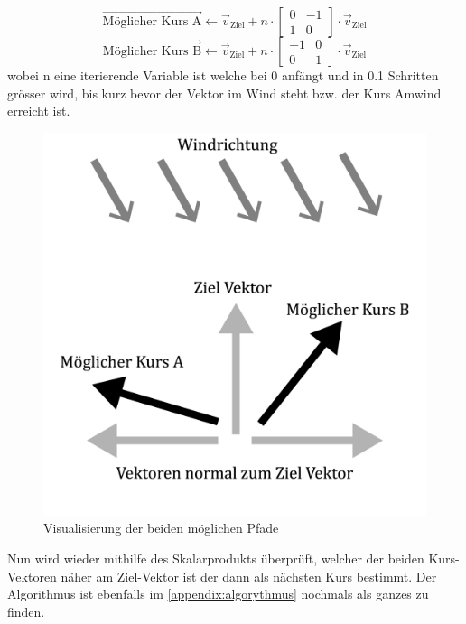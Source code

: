 $$\vec{\text{Möglicher Kurs A}} \gets \vec{v}_{\text{Ziel}} + n \cdot \begin{bmatrix}0 & -1 \\ 1 & 0\end{bmatrix} \cdot \vec{v}_{\text{Ziel}}$$
$$\vec{\text{Möglicher Kurs B}} \gets \vec{v}_{\text{Ziel}} + n \cdot \begin{bmatrix}-1 & 0 \\ 0 & 1\end{bmatrix} \cdot \vec{v}_{\text{Ziel}}$$
wobei n eine iterierende Variable ist welche bei 0 anfängt und in 0.1 Schritten grösser wird, bis kurz bevor der Vektor im Wind steht bzw. der Kurs Amwind erreicht ist. \\
\begin{figure}[H]
    \centering
    \includegraphics[width=0.5\linewidth]{algorythmus Vektoren.png}
    \caption{Visualisierung der beiden möglichen Pfade}
    \label{fig:enter-label}
\end{figure}
Nun wird wieder mithilfe des Skalarprodukts überprüft, welcher der beiden Kurs-Vektoren näher am Ziel-Vektor ist der dann als nächsten Kurs bestimmt. Der Algorithmus ist ebenfalls im \cref{appendix:algorythmus} nochmals als ganzes zu finden.
